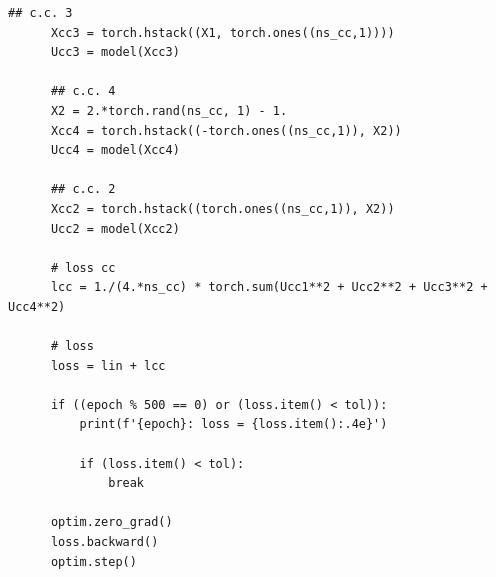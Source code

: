 \begin{lstlisting}[caption=py\_pinn\_poisson]
      ## c.c. 3
      Xcc3 = torch.hstack((X1, torch.ones((ns_cc,1))))
      Ucc3 = model(Xcc3)
      
      ## c.c. 4
      X2 = 2.*torch.rand(ns_cc, 1) - 1.
      Xcc4 = torch.hstack((-torch.ones((ns_cc,1)), X2))
      Ucc4 = model(Xcc4)
      
      ## c.c. 2
      Xcc2 = torch.hstack((torch.ones((ns_cc,1)), X2))
      Ucc2 = model(Xcc2)
      
      # loss cc
      lcc = 1./(4.*ns_cc) * torch.sum(Ucc1**2 + Ucc2**2 + Ucc3**2 + Ucc4**2)
      
      # loss
      loss = lin + lcc
      
      if ((epoch % 500 == 0) or (loss.item() < tol)):
          print(f'{epoch}: loss = {loss.item():.4e}')        
  
          if (loss.item() < tol):
              break
      
      optim.zero_grad()
      loss.backward()
      optim.step()
\end{lstlisting}




